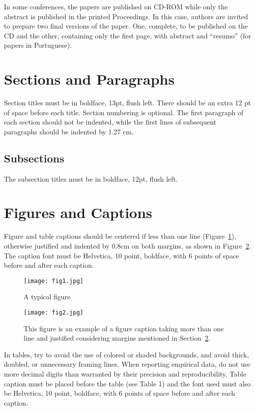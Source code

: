 \documentclass[12pt]{article}
\begin{document}
In some conferences, the papers are published on CD-ROM while only the
abstract is published in the printed Proceedings. In this case, authors are
invited to prepare two final versions of the paper. One, complete, to be
published on the CD and the other, containing only the first page, with
abstract and ``resumo'' (for papers in Portuguese).

\section{Sections and Paragraphs}

Section titles must be in boldface, 13pt, flush left. There should be an extra
12 pt of space before each title. Section numbering is optional. The first
paragraph of each section should not be indented, while the first lines of
subsequent paragraphs should be indented by 1.27 cm.

\subsection{Subsections}

The subsection titles must be in boldface, 12pt, flush left.

\section{Figures and Captions}\label{sec:figs}


Figure and table captions should be centered if less than one line
(Figure~\ref{fig:exampleFig1}), otherwise justified and indented by 0.8cm on
both margins, as shown in Figure~\ref{fig:exampleFig2}. The caption font must
be Helvetica, 10 point, boldface, with 6 points of space before and after each
caption.

\begin{figure}[ht]
\centering
\texttt{[image: fig1.jpg]}
\caption{A typical figure}
\label{fig:exampleFig1}
\end{figure}

\begin{figure}[ht]
\centering
\texttt{[image: fig2.jpg]}
\caption{This figure is an example of a figure caption taking more than one
  line and justified considering margins mentioned in Section~\ref{sec:figs}.}
\label{fig:exampleFig2}
\end{figure}

In tables, try to avoid the use of colored or shaded backgrounds, and avoid
thick, doubled, or unnecessary framing lines. When reporting empirical data,
do not use more decimal digits than warranted by their precision and
reproducibility. Table caption must be placed before the table (see Table 1)
and the font used must also be Helvetica, 10 point, boldface, with 6 points of
space before and after each caption.
\end{document}
